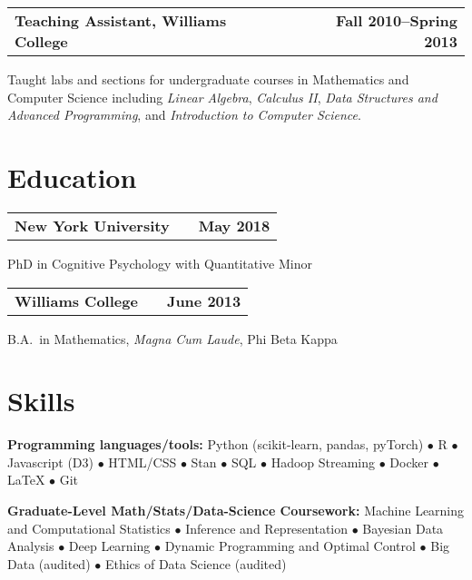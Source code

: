 \documentclass[10pt]{resume}
\begin{document}
\begin{addmargin}[1em]{0em}
\begin{tabular}{@{} L M R}
  \textbf{Teaching Assistant, Williams College}& &\textbf{Fall 2010--Spring 2013}\\
\end{tabular}\vspace{-1em}
  Taught labs and sections for undergraduate courses in Mathematics and Computer Science
  including \emph{Linear Algebra}, \emph{Calculus II}, \emph{Data Structures and Advanced
  Programming}, and \emph{Introduction to Computer Science}.

\end{addmargin}

\section{Education}

\hrulefill

\begin{addmargin}[1em]{0em}

\begin{tabular}{@{} L M R}
  \textbf{New York University}& &\textbf{May 2018}\\
\end{tabular}\vspace{-1em}
  PhD in Cognitive Psychology with Quantitative Minor

\begin{tabular}{@{} L M R}
  \textbf{Williams College}& &\textbf{June 2013}\\
\end{tabular}\vspace{-1em}
  B.A.\ in Mathematics, \emph{Magna Cum Laude}, Phi Beta Kappa

\end{addmargin}

\section{Skills}

\hrulefill

\begin{addmargin}[1em]{0em}
\textbf{Programming languages/tools:}
Python (scikit-learn, pandas, pyTorch) $\bullet$ R $\bullet$ Javascript (D3)
$\bullet$ HTML/CSS $\bullet$ Stan $\bullet$ SQL $\bullet$
Hadoop Streaming $\bullet$ Docker $\bullet$ LaTeX $\bullet$ Git

\textbf{Graduate-Level Math/Stats/Data-Science Coursework:}
Machine Learning and Computational Statistics $\bullet$ Inference and
Representation $\bullet$ Bayesian Data Analysis $\bullet$ Deep Learning
$\bullet$ Dynamic Programming and Optimal Control $\bullet$
Big Data (audited) $\bullet$ Ethics of Data Science (audited)

\end{addmargin}
\end{document}
